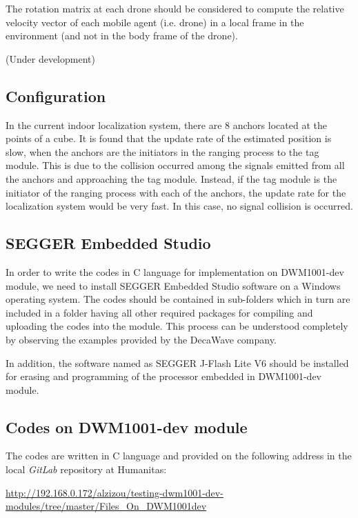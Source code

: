 \documentclass{article}
\begin{document}
The rotation matrix at each drone should be considered to compute the relative velocity vector of each mobile agent (i.e. drone) in a local frame in the environment (and not in the body frame of the drone).

(Under development)


\subsection{Configuration}
In the current indoor localization system, there are 8 anchors located at the points of a cube. 
It is found that the update rate of the estimated position is slow, when the anchors are the initiators in the ranging process to the tag module. This is due to the collision occurred among the signals emitted from all the anchors and approaching the tag module.
Instead, if the tag module is the initiator of the ranging process with each of the anchors, the update rate for the localization system would be very fast. In this case, no signal collision is occurred.


\subsection{SEGGER Embedded Studio}
In order to write the codes in \textsf{C} language for implementation on DWM1001-dev module, we need to install \textsf{SEGGER Embedded Studio} software on a Windows operating system. The codes should be contained in sub-folders which in turn are included in a folder having all other required packages for compiling and uploading the codes into the module. This process can be understood completely by observing the examples provided by the DecaWave company. 

In addition, the software named as \textsf{SEGGER J-Flash Lite V6} should be installed for erasing and programming of the processor embedded in DWM1001-dev module. 

\subsection{Codes on DWM1001-dev module}
The codes are written in C language and provided on the following address in the local \textit{GitLab} repository at Humanitas:

\url{http://192.168.0.172/alzizou/testing-dwm1001-dev-modules/tree/master/Files_On_DWM1001dev}
\end{document}
